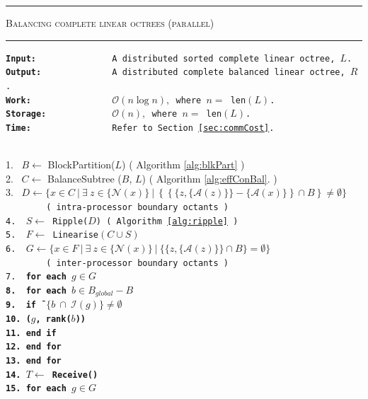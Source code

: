 \begin{table} 
\centering
\rule{\textwidth}{0.01mm}
\begin{algorithm}{ \textsc{Balancing complete linear octrees (parallel)}}
\rule{\textwidth}{0.01mm}
\flushleft
\tt{\bf{Input:~~~~~~~~~~~~~~}} A distributed sorted complete linear octree, $L$.\\
\tt{\bf{Output:~~~~~~~~~~~~~}} A distributed complete balanced linear octree, $R$.\\
\tt{\bf{Work:~~~~~~~~~~~~~~~}} $\mathcal{O}(n\log n),$ where $n = $ len$(L)$.\\
\tt{\bf{Storage:~~~~~~~~~~~~}} $\mathcal{O}(n),$ where $n = $ len$(L)$.\\
\tt{\bf{Time:~~~~~~~~~~~~~~~}} Refer to Section \ref{sec:commCost}.\\
~\\
\begin{tabbing}
1.~ $B \leftarrow$ BlockPartition($L$) ( Algorithm \ref{alg:blkPart} )\\
2.~ $C \leftarrow$ BalanceSubtree ($B$, $L$) ( Algorithm \ref{alg:effConBal}. )\\
3.~ $D \leftarrow \{x \in C ~|~ \exists ~z \in \{\mathcal{N}(x)\} ~|~ \left\{ \left\{\{z,\{\mathcal{A}(z)\}\}  - \{\mathcal{A}(x)\} \right\} \cap B \right\}\neq \emptyset \}$ \\
\tt{~~~~~~~~( intra-processor boundary octants )}\\
4.~ $S \leftarrow $ Ripple($D$) ( Algorithm \ref{alg:ripple} )\\
5.~ $F \leftarrow $ Linearise$\left(C \cup S\right)$\\
6.~ $G \leftarrow \{x \in F ~|~ \exists ~z \in \{\mathcal{N}(x)\} ~|~ \{\{z,\{\mathcal{A}(z)\}\} \cap B\} = \emptyset \}$ \\
\tt{~~~~~~~~( inter-processor boundary octants )}\\
7.~ \tt{\bf for} \=\bf{each} {$g \in G$}\\
8.~ \> \tt{\bf for} \=\bf{each} {$b \in B_{global} - B$}\\
9.~ \>\> {\bf if} \= $\{b ~\cap~ \mathcal{I}(g)\} \neq \emptyset$\\
10.	\>\>($g$, rank($b$))\\
11. \>\> {\bf end if}\\
12. \> \tt{\bf end for}\\
13. \tt{\bf end for}\\
14. $T \leftarrow$ Receive()\\
15. \tt{\bf for} \=\bf{each} {$g \in G$}\\

\end{tabbing}
\end{algorithm}
\end{table}
